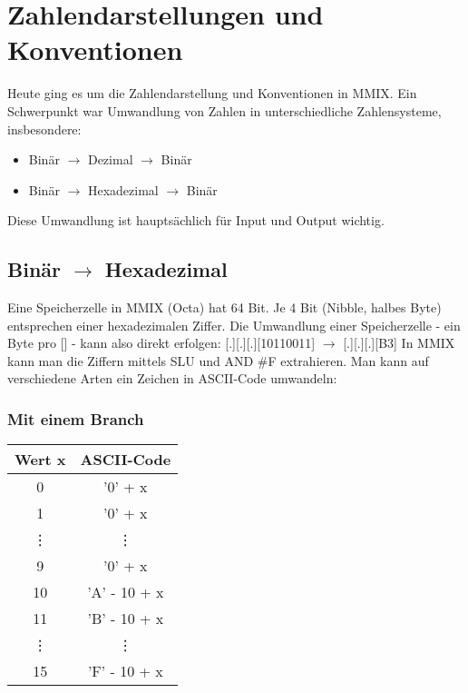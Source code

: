 \renewcommand{\ldate}{2015-05-06}	%
\fancyfoot[R]{\tiny{SS 2015 / \ldate}}

\section{Zahlendarstellungen und Konventionen} 

Heute ging es um die Zahlendarstellung und Konventionen in MMIX. Ein Schwerpunkt war Umwandlung von Zahlen in unterschiedliche Zahlensysteme, insbesondere:
\begin{itemize}
\item Binär $ \rightarrow $ Dezimal $ \rightarrow $ Binär
\item Binär $ \rightarrow $ Hexadezimal $ \rightarrow $ Binär
\end{itemize}
Diese Umwandlung ist hauptsächlich für Input und Output wichtig. 

\subsection{Binär $ \rightarrow $ Hexadezimal}

Eine Speicherzelle in MMIX (Octa) hat 64 Bit. Je 4 Bit (Nibble, halbes Byte) entsprechen einer hexadezimalen Ziffer.  Die Umwandlung einer Speicherzelle - ein Byte pro [] - kann also direkt erfolgen: [.][.][.][10110011] $ \rightarrow $ [.][.][.][B3]
In MMIX kann man die Ziffern mittels SLU und AND \#F extrahieren. Man kann auf verschiedene Arten ein Zeichen in ASCII-Code umwandeln:

\subsubsection{Mit einem Branch}


\begin{tabular}{|c|c|}
\hline Wert x & ASCII-Code \\ 
\hline 0 & '0' + x \\ 
\hline 1 & '0' + x \\ 
\hline \vdots & \vdots \\ 
\hline 9 & '0' + x \\ 
\hline 10 & 'A' - 10 + x \\ 
\hline 11 & 'B' - 10 + x \\ 
\hline \vdots & \vdots \\ 
\hline 15 & 'F' - 10 + x \\ 
\hline 
\end{tabular}

